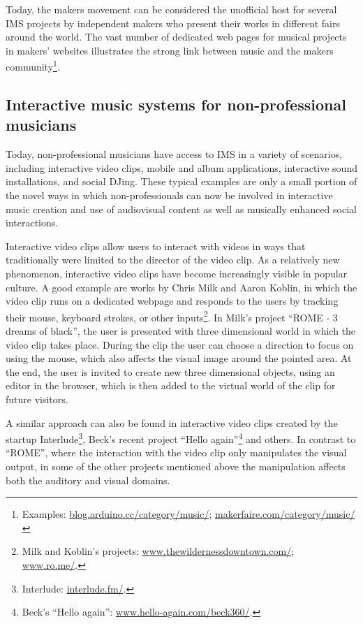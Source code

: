\documentclass[a4paper,11pt]{article}
\begin{document}
Today, the makers movement can be considered the unofficial host for several IMS projects by independent makers who present their works in different fairs around the world.
The vast number of dedicated web pages for musical projects in makers' websites illustrates the strong link between music and the makers community\footnote{Examples: \href{http://blog.arduino.cc/category/music/}{blog.arduino.cc/category/music/}; \href{http://makerfaire.com/category/music/}{makerfaire.com/category/music/}}.

\subsection{Interactive music systems for non-professional musicians} \label{literature:non_pro_ims}

Today, non-professional musicians have access to IMS in a variety of scenarios, including interactive video clips, mobile and album applications, interactive sound installations, and social DJing.
These typical examples are only a small portion of the novel ways in which non-professionals can now be involved in interactive music creation and use of audiovisual content as well as musically enhanced social interactions.

Interactive video clips allow users to interact with videos in ways that traditionally were limited to the director of the video clip.
As a relatively new phenomenon, interactive video clips have become increasingly visible in popular culture.
A good example are works by Chris Milk and Aaron Koblin, in which the video clip runs on a dedicated webpage and responds to the users by tracking their mouse, keyboard strokes, or other inputs\footnote{Milk and Koblin's projects: \href{http://www.thewildernessdowntown.com/}{www.thewildernessdowntown.com/}; \href{http://www.ro.me/}{www.ro.me/}.}.
In Milk's project ``ROME - 3 dreams of black'', the user is presented with three dimensional world in which the video clip takes place.
During the clip the user can choose a direction to focus on using the mouse, which also affects the visual image around the pointed area.
At the end, the user is invited to create new three dimensional objects, using an editor in the browser, which is then added to the virtual world of the clip for future visitors.

A similar approach can also be found in interactive video clips created by the startup Interlude\footnote{Interlude: \href{http://interlude.fm/}{interlude.fm/}.}, Beck's recent project ``Hello again''\footnote{Beck's ``Hello again'': \href{http://www.hello-again.com/beck360/}{www.hello-again.com/beck360/}.} and others.
In contrast to ``ROME'', where the interaction with the video clip only manipulates the visual output, in some of the other projects mentioned above the manipulation affects both the auditory and visual domains.
\end{document}
